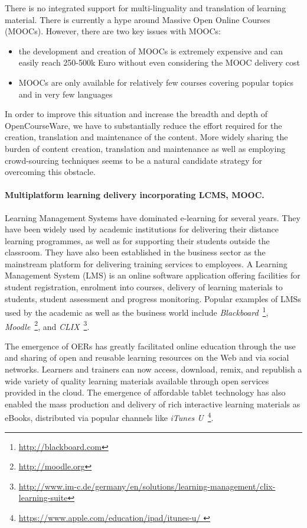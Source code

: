 \documentclass[ngerman,UKenglish,table]{scrbook}
\begin{document}
There is no integrated support for multi-linguality and translation of learning material.
There is currently a hype around Massive Open Online Courses (MOOCs).
However, there are two key issues with MOOCs:
\begin{itemize}
\item the development and creation of MOOCs is extremely expensive and can easily reach 250-500k Euro without even considering the MOOC delivery cost
\item MOOCs are only available for relatively few courses covering popular topics and in very few languages
\end{itemize}

In order to improve this situation and increase the breadth and depth of OpenCourseWare, we have to substantially reduce the effort required for the creation, translation and maintenance of the content.
More widely sharing the burden of content creation, translation and maintenance as well as employing crowd-sourcing techniques seems to be a natural candidate strategy for overcoming this obstacle.

\paragraph{Multiplatform learning delivery incorporating LCMS, MOOC.}
Learning Management Systems have dominated e-learning for several years.
They have been widely used by academic institutions for delivering their distance learning programmes, as well as for supporting their students outside the classroom.
They have also been established in the business sector as the mainstream platform for delivering training services to employees.
A Learning Management System (LMS) is an online software application offering facilities for student registration, enrolment into courses, delivery of learning materials to students, student assessment and progress monitoring.
Popular examples of LMSs used by the academic as well as the business world include \emph{Blackboard}~\footnote{\url{http://blackboard.com}}, \emph{Moodle}~\footnote{\url{http://moodle.org}}, and \emph{CLIX}~\footnote{\url{http://www.im-c.de/germany/en/solutions/learning-management/clix-learning-suite}}.

The emergence of OERs has greatly facilitated online education through the use and sharing of open and reusable learning resources on the Web and via social networks.
Learners and trainers can now access, download, remix, and republish a wide variety of quality learning materials available through open services provided in the cloud.
The emergence of affordable tablet technology has also enabled the mass production and delivery of rich interactive learning materials as eBooks, distributed via popular channels like \emph{iTunes U}~\footnote{\url{https://www.apple.com/education/ipad/itunes-u/ }}.
\end{document}
